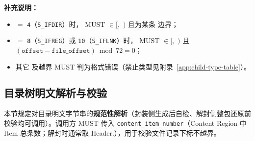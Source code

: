 \textbf{补充说明：}
\begin{itemize}
  \item {} $=$ \texttt{4}（\texttt{S\_IFDIR}）时， MUST $\in [$,\ $)$ 且为某条  边界；
  \item {} $=$ \texttt{8}（\texttt{S\_IFREG}）或 \texttt{10}（\texttt{S\_IFLNK}）时， MUST $\in [$,\ $)$ 且 $(\mathtt{offset}-\mathtt{file\_offset}) \bmod 72 = 0$；
  \item 其它  及越界  MUST 判为格式错误（禁止类型见附录~\ref{app:child-type-table}）。
\end{itemize}

\subsection{目录树明文解析与校验}\label{sec:directory-tree-parse}

本节规定对目录明文字节串的\textbf{规范性解析}（封装侧生成后自检、解封侧整包还原前校验均可调用）。调用方 MUST 传入 \texttt{content\_item\_number}（Content Region 中 Item 总条数；解封时通常取 Header.），用于校验文件记录下标不越界。


